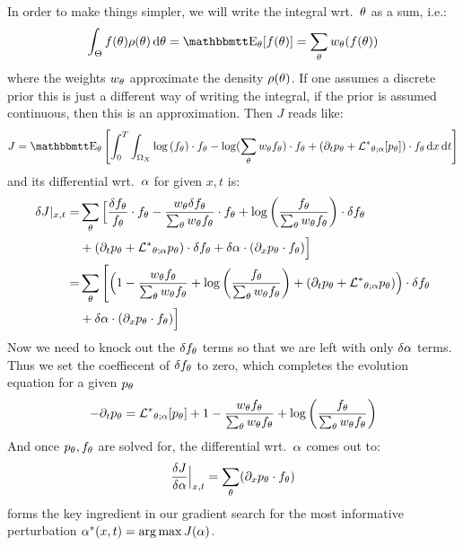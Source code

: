 \documentclass{article}
\begin{document}
In order to make things simpler, we will write the integral wrt.\
${\theta}$ as a sum, i.e.:
$$
\int_\Theta f(\th) \rho(\th) \intd{\th} = \Exp_\th [f(\th) ] = 
\sum_\th w_\th (f(\th))
$$ where the weights $w_{\theta}$ approximate the density $\rho({\theta})$.
If one assumes a discrete prior this is just a different way of writing the
integral, if the prior is assumed continuous, then this is an approximation.
Then $J$ reads like:
\def \ft {{ f_\th}}
\def \pt {{ p_\th}}
\def \dft {{ \delta f_\th}}
\def \wt {{ w_\th }}
$$
J =  \Exp_\th
\left[ \int_0^T\int_{\O_X} \log\left(f_\th\right)\cdot \ft - 
\log(\sum_\th \wt \ft) \cdot f_\th 
 			 + 
 			 (\di_t p_\th + \Lstar_{\th;\a} [p_\th] ) \cdot f_\th
\intd{x}
\intd{t} \right]
$$
and its differential wrt.\ ${\alpha}$ for given $x,t$ is:
\begin{align*}
\delta J|_{x,t} =& \sum_\th \Big[
\frac{\dft}{\ft} \cdot \ft - \frac{  w_\th \dft }{\sum_\th w_\th\ft}\cdot \ft 
+ \log\left(\frac{f_\th} {\sum_\th \wt \ft }\right) \cdot \dft  
\\&
+  (\di_t p_\th + \Lstar_{\th;\a} p_\th ) \cdot \dft
+ \delta \a \cdot (\di_x \pt \cdot \ft)
\Big]
\\
=& \sum_\th \Bigg[\Big(
1 - \frac{  w_\th \ft }{\sum_\th w_\th\ft} 
+ \log\left(\frac{f_\th} {\sum_\th \wt \ft }\right)   
+  (\di_t p_\th + \Lstar_{\th;\a} p_\th )
\Big)  \cdot \dft 
\\
&+ \delta \a \cdot (\di_x \pt \cdot \ft)
\Big]
\end{align*}
Now we need to knock out the $\dft$ terms so that we are left with only $\delta
{\alpha}$ terms. Thus we set the coeffiecent of $\dft$ to zero, which completes the 
evolution equation for a given $p_{\theta}$
\begin{equation}
-\di_t \pt = 
\Lstar_{\th;\a} [p_\th] +  
1 - \frac{  w_\th \ft }{\sum_\th w_\th\ft} 
+ \log\left(\frac{f_\th} {\sum_\th \wt \ft }\right)   
\end{equation}
And once $\pt, \ft$ are solved for, the differential wrt.\ ${\alpha}$ comes
out to:
\begin{equation}
\frac {\delta J}{\delta \a} \Big|_{x,t} = \sum_\th (\di_x \pt \cdot \ft)
\label{eq:differential_objective_wrt_control_final}
\end{equation}
 forms the key ingredient
in our gradient search for the most informative perturbation $\a^*(x,t) =
\argmax J(\a)$.
\end{document}
